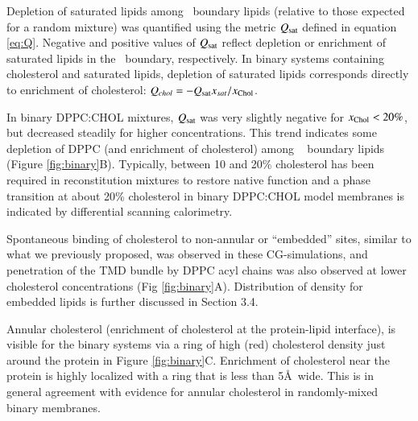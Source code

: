 Depletion of saturated lipids among \nachr~boundary lipids (relative to those expected for a random mixture) was quantified using the metric $Q_{\mathrm{sat}}$ defined in equation \ref{eq:Q}. Negative and positive values of $Q_{\mathrm{sat}}$ reflect depletion or enrichment of saturated lipids in the \nachr~boundary, respectively. In binary systems containing cholesterol and saturated lipids, depletion of saturated lipids corresponds directly to enrichment of cholesterol: $Q_{chol} = -Q_{\mathrm{sat}} x_{sat}/x_{\mathrm{Chol}}$. %

In binary DPPC:CHOL mixtures, $Q_{\mathrm{sat}}$ was very slightly negative for $x_{\mathrm{Chol}} < 20\%$, but decreased steadily for higher concentrations. This trend indicates some depletion of DPPC (and enrichment of cholesterol) among \nachr~ boundary lipids (Figure \ref{fig:binary}B).  Typically, between 10 and 20\% cholesterol has been required in reconstitution mixtures to restore native function  \cite{Fong_Correlation_1986,Dalziel1980,Criado1982}  and a phase transition at about 20\% cholesterol in binary DPPC:CHOL model membranes is indicated by differential scanning calorimetry.\cite{Marsh2010} 

Spontaneous binding of cholesterol to non-annular or ``embedded'' sites, similar to what we previously proposed\cite{Brannigan_Embedded_2008}, was observed in these CG-simulations, and penetration of the TMD bundle by DPPC acyl chains was also observed at lower cholesterol concentrations (Fig \ref{fig:binary}A).  Distribution of density for embedded lipids is further discussed in Section 3.4.  %

Annular cholesterol (enrichment of cholesterol at the protein-lipid interface), is visible for the binary systems via a ring of high (red) cholesterol density just around the protein in Figure \ref{fig:binary}C. Enrichment of cholesterol near the protein is highly localized with a ring that is less than 5\AA~wide. This is in general agreement with evidence for annular cholesterol in randomly-mixed binary membranes. \cite{Barrantes2010}


